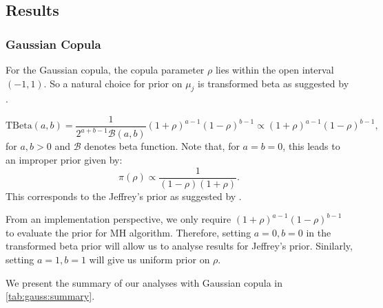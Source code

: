 \documentclass{amsart}
\begin{document}
\subsection{Results}

\subsubsection{Gaussian Copula} For the Gaussian copula, the copula parameter $\rho$ lies within the open interval $(-1,1)$. So a natural choice for prior on $\mu_j$ is transformed beta as suggested by \citet{gokhale_prior_cor}. 

\begin{equation}
	\text{TBeta}(a, b) = \frac{1}{2^{a+b-1}\mathcal{B}(a,b)}(1+\rho)^{a-1}(1-\rho)^{b-1}\propto(1+\rho)^{a-1}(1-\rho)^{b-1},
\end{equation}
for $a,b>0$ and $\mathcal{B}$ denotes beta function. Note that, for $a=b=0$, this leads to an improper prior given by:
\begin{equation}
    \pi(\rho) \propto \frac{1}{(1-\rho)(1+\rho)}.
\end{equation}
This corresponds to the Jeffrey's prior as suggested by \citet{berger_2008_objective}.

From an implementation perspective, we only require $(1+\rho)^{a-1}(1-\rho)^{b-1}$ to evaluate the prior for MH algorithm. Therefore, setting $a=0, b=0$ in the transformed beta prior will allow us to analyse results for Jeffrey's prior. Sinilarly, setting $a=1,b=1$ will give us uniform prior on $\rho$.

We present the summary of our analyses with Gaussian copula in \cref{tab:gauss:summary}. 
\end{document}
